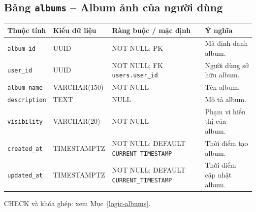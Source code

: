 \subsection{Bảng \texttt{albums} -- Album ảnh của người dùng}
\label{dictionary-albums}
\begingroup
\footnotesize
\setlength{\tabcolsep}{3pt}
\begin{longtable}{>{\raggedright\arraybackslash}p{3.1cm}>{\raggedright\arraybackslash}p{2.5cm}>{\raggedright\arraybackslash}p{3.7cm}>{\raggedright\arraybackslash}p{4.3cm}}
\toprule
Thuộc tính & Kiểu dữ liệu & Ràng buộc / mặc định & Ý nghĩa \\
\midrule
\endhead
\texttt{album\_\allowbreak{}id} & UUID & NOT NULL; PK & Mã định danh album. \\
\texttt{user\_\allowbreak{}id} & UUID & NOT NULL; FK \texttt{users.user\_\allowbreak{}id} & Người dùng sở hữu album. \\
\texttt{album\_\allowbreak{}name} & VARCHAR(150) & NOT NULL & Tên album. \\
\texttt{description} & TEXT & NULL & Mô tả album. \\
\texttt{visibility} & VARCHAR(20) & NOT NULL & Phạm vi hiển thị của album. \\
\texttt{created\_\allowbreak{}at} & TIMESTAMPTZ & NOT NULL; DEFAULT \texttt{CURRENT\_\allowbreak{}TIMESTAMP} & Thời điểm tạo album. \\
\texttt{updated\_\allowbreak{}at} & TIMESTAMPTZ & NOT NULL; DEFAULT \texttt{CURRENT\_\allowbreak{}TIMESTAMP} & Thời điểm cập nhật album. \\
\bottomrule
\end{longtable}
\endgroup
CHECK và khóa ghép: xem Mục~\ref{logic-albums}.

